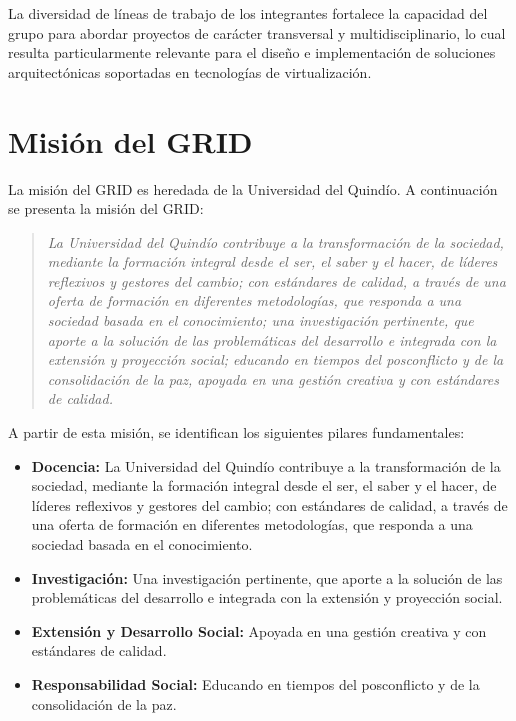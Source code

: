 La diversidad de líneas de trabajo de los integrantes fortalece la capacidad del grupo para abordar proyectos de carácter transversal y multidisciplinario, lo cual resulta particularmente relevante para el diseño e implementación de soluciones arquitectónicas soportadas en tecnologías de virtualización.

\section{Misión del GRID}
La misión del GRID es heredada de la Universidad del Quindío. A continuación se presenta la misión del GRID:\@

\begin{quote}
	\textit{La Universidad del Quindío contribuye a la transformación de la sociedad, mediante la formación integral desde el ser, el saber y el hacer, de líderes reflexivos y gestores del cambio; con estándares de calidad, a través de una oferta de formación en diferentes metodologías, que responda a una sociedad basada en el conocimiento; una investigación pertinente, que aporte a la solución de las problemáticas del desarrollo e integrada con la extensión y proyección social; educando en tiempos del posconflicto y de la consolidación de la paz, apoyada en una gestión creativa y con estándares de calidad.}
\end{quote}

A partir de esta misión, se identifican los siguientes pilares fundamentales:

\begin{itemize}
	\item \textbf{Docencia:} La Universidad del Quindío contribuye a la transformación de la sociedad, mediante la formación integral desde el ser, el saber y el hacer, de líderes reflexivos y gestores del cambio; con estándares de calidad, a través de una oferta de formación en diferentes metodologías, que responda a una sociedad basada en el conocimiento.

	\item \textbf{Investigación:} Una investigación pertinente, que aporte a la solución de las problemáticas del desarrollo e integrada con la extensión y proyección social.

	\item \textbf{Extensión y Desarrollo Social:} Apoyada en una gestión creativa y con estándares de calidad.

	\item \textbf{Responsabilidad Social:} Educando en tiempos del posconflicto y de la consolidación de la paz.
\end{itemize}


